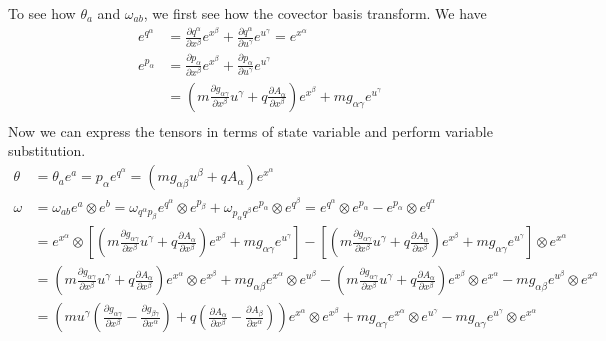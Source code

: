 To see how $\theta_a$ and $\omega_{ab}$, we first see how the covector basis transform. We have
\begin{equation}
	\begin{aligned}
		e^{q^\alpha} &= \frac{\partial q^\alpha}{\partial x^\beta}e^{x^\beta} + \frac{\partial q^\alpha}{\partial u^\gamma}e^{u^\gamma} = e^{x^\alpha} \\
		e^{p_\alpha} &= \frac{\partial p_\alpha}{\partial x^\beta}e^{x^\beta} + \frac{\partial p_\alpha}{\partial u^\gamma}e^{u^\gamma} \\
		&= \left(m \frac{\partial g_{\alpha\gamma}}{\partial x^\beta} u^\gamma + q \frac{\partial A_\alpha}{\partial x^\beta} \right)e^{x^\beta} + m g_{\alpha \gamma} e^{u^\gamma} \\
	\end{aligned}
\end{equation}
Now we can express the tensors in terms of state variable and perform variable substitution. 
\begin{equation}
	\begin{aligned}
		\theta &= \theta_a e^a = p_\alpha e^{q^\alpha} = (m g_{\alpha \beta} u^\beta + q A_\alpha) e^{x^\alpha} \\
		\omega &= \omega_{ab}e^a \otimes e^b = \omega_{q^{\alpha} p_{\beta}}e^{q^\alpha} \otimes e^{p_\beta} + \omega_{p_{\alpha} q^{\beta}}e^{p_\alpha} \otimes e^{q^\beta} = e^{q^\alpha} \otimes e^{p_\alpha} - e^{p_\alpha} \otimes e^{q^\alpha} \\
		&=  e^{x^\alpha} \otimes \left[ \left(m \frac{\partial g_{\alpha\gamma}}{\partial x^\beta} u^\gamma + q \frac{\partial A_\alpha}{\partial x^\beta} \right)e^{x^\beta} + m g_{\alpha \gamma} e^{u^\gamma} \right] - \left[ \left(m \frac{\partial g_{\alpha\gamma}}{\partial x^\beta} u^\gamma + q \frac{\partial A_\alpha}{\partial x^\beta} \right)e^{x^\beta} + m g_{\alpha \gamma} e^{u^\gamma} \right] \otimes e^{x^\alpha}  \\
		&=  \left(m \frac{\partial g_{\alpha\gamma}}{\partial x^\beta} u^\gamma + q \frac{\partial A_\alpha}{\partial x^\beta} \right) e^{x^\alpha} \otimes e^{x^\beta} + m g_{\alpha \beta} e^{x^\alpha} \otimes e^{u^\beta} - \left(m \frac{\partial g_{\alpha\gamma}}{\partial x^\beta} u^\gamma + q \frac{\partial A_\alpha}{\partial x^\beta} \right)e^{x^\beta} \otimes e^{x^\alpha} - m g_{\alpha \beta} e^{u^\beta} \otimes e^{x^\alpha}  \\
		&= \left(m u^\gamma \left( \frac{\partial g_{\alpha\gamma}}{\partial x^\beta} -  \frac{\partial g_{\beta\gamma}}{\partial x^\alpha}\right) + q \left( \frac{\partial A_\alpha}{\partial x^\beta} - \frac{\partial A_\beta}{\partial x^\alpha}\right) \right) e^{x^\alpha} \otimes e^{x^\beta} + m g_{\alpha \gamma} e^{x^\alpha} \otimes e^{u^\gamma} - m g_{\alpha \gamma} e^{u^\gamma} \otimes e^{x^\alpha} \\
	\end{aligned}
\end{equation}
